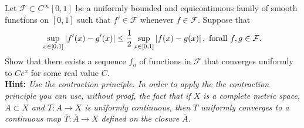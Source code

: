 \documentclass[11pt]{article}
\theoremstyle{definition}
\numberwithin{equation}{subsection}
\begin{document}
Let $\mathcal{F} \subset C^\infty[0,1]$ be a uniformly bounded and equicontinuous family of smooth functions on $[0,1]$ such that $f' \in \mathcal{F}$ whenever $f \in \mathcal{F}$. Suppose that 
\begin{align*}
    \sup_{x\in[0,1]} \left|f'(x) - g'(x)\right| \leq \frac{1}{2} \sup_{x\in[0,1]} \left|f(x) - g(x)\right|, \,\, {\rm for all}\,\, f, g \in \mathcal{F}.
\end{align*}
Show that there exists a sequence $f_n$ of functions in $\mathcal{F}$ that converges uniformly to $Ce^x$ for some real value $C$.\\
{\bf Hint:} {\em Use the contraction principle. In order to apply the the contraction principle you can use, without proof, the fact that if $X$ is a complete metric space, $A \subset X$ and $T: A \to X$ is uniformly continuous, then $T$ uniformly converges to a continuous map $\overline{T}: \overline{A} \to X$ defined on the closure $\overline{A}$.}
\end{document}
